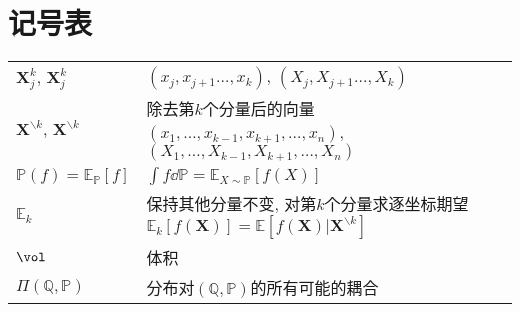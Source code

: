 \section*{记号表}

\begin{tabular}{p{} p{}}
\hline
	$\bm{X}_j^k$, $\bm{X}_j^k$ & $(x_j, x_{j+1} \dots, x_k)$, $(X_j, X_{j+1} \dots, X_k)$ \\
	$\bm{X}^{\backslash k}$, $\bm{X}^{\backslash k}$ & 除去第$k$个分量后的向量$(x_1, \dots, x_{k-1}, x_{k+1}, \dots, x_n)$, $(X_1, \dots, X_{k-1}, X_{k+1}, \dots, X_n)$ \\
	$\mathbb{P}(f) = \mathbb{E}_{\mathbb{P}}[f]$ & $\int f \dd \mathbb{P} = \mathbb{E}_{X \sim \mathbb{P}} [f(X)]$ \\
	$\mathbb{E}_k$ & 保持其他分量不变, 对第$k$个分量求逐坐标期望$\mathbb{E}_k[f(\bm{X})] = \mathbb{E}[f(\bm{X}) | \bm{X}^{\backslash k}]$ \\
	$\vol$ & 体积 \\
	$\Pi(\mathbb{Q}, \mathbb{P})$ & 分布对$(\mathbb{Q}, \mathbb{P})$的所有可能的耦合 \\
\hline
\end{tabular}
